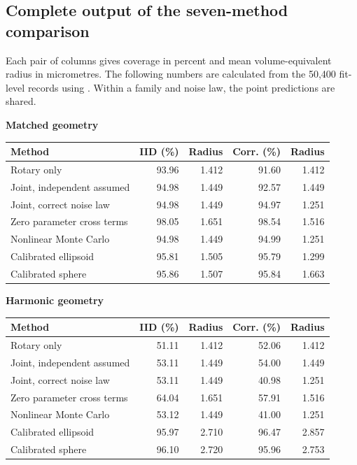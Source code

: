 \clearpage\subsection{Complete output of the seven-method comparison}Each pair of columns gives coverage in percent and mean volume-equivalent radius in micrometres. The following numbers are calculated from the 50,400 fit-level records using . Within a family and noise law, the point predictions are shared.

\textbf{Matched geometry}

\begin{center}\small\begin{tabular}{@{}lrrrr@{}}\toprule
Method & IID (\%) & Radius & Corr. (\%) & Radius\\\midrule
Rotary only & 93.96 & 1.412 & 91.60 & 1.412\\
Joint, independent assumed & 94.98 & 1.449 & 92.57 & 1.449\\
Joint, correct noise law & 94.98 & 1.449 & 94.97 & 1.251\\
Zero parameter cross terms & 98.05 & 1.651 & 98.54 & 1.516\\
Nonlinear Monte Carlo & 94.98 & 1.449 & 94.99 & 1.251\\
Calibrated ellipsoid & 95.81 & 1.505 & 95.79 & 1.299\\
Calibrated sphere & 95.86 & 1.507 & 95.84 & 1.663\\
\bottomrule\end{tabular}\end{center}

\textbf{Harmonic geometry}

\begin{center}\small\begin{tabular}{@{}lrrrr@{}}\toprule
Method & IID (\%) & Radius & Corr. (\%) & Radius\\\midrule
Rotary only & 51.11 & 1.412 & 52.06 & 1.412\\
Joint, independent assumed & 53.11 & 1.449 & 54.00 & 1.449\\
Joint, correct noise law & 53.11 & 1.449 & 40.98 & 1.251\\
Zero parameter cross terms & 64.04 & 1.651 & 57.91 & 1.516\\
Nonlinear Monte Carlo & 53.12 & 1.449 & 41.00 & 1.251\\
Calibrated ellipsoid & 95.97 & 2.710 & 96.47 & 2.857\\
Calibrated sphere & 96.10 & 2.720 & 95.96 & 2.753\\
\bottomrule\end{tabular}\end{center}

